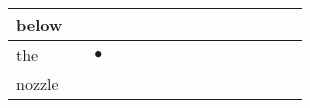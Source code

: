\documentclass[landscape]{article}
\newcommand{\ssp}{\hspace{2pt}}
\newcommand{\mex}{\cellcolor{g}$\bullet$}
\begin{document}
\begin{tabular}{|l|p{10pt}|p{10pt}|p{10pt}|p{10pt}|p{10pt}|p{10pt}|p{10pt}|p{10pt}|p{10pt}|p{10pt}|p{10pt}|p{10pt}|p{10pt}|p{10pt}|}
\ssp below \ssp&\hspace{2pt}&\hspace{2pt}&\hspace{2pt}&\hspace{2pt}&\hspace{2pt}&\hspace{2pt}&\hspace{2pt}&\hspace{2pt}&\hspace{2pt}&\hspace{2pt}&\hspace{2pt}&\hspace{2pt}&\hspace{2pt}&\hspace{2pt}\\
\hline
\ssp \cellcolor{ref1}the \ssp&\hspace{2pt}&\hspace{2pt}\mex&\hspace{2pt}&\hspace{2pt}&\hspace{2pt}&\hspace{2pt}&\hspace{2pt}&\hspace{2pt}&\hspace{2pt}&\hspace{2pt}&\hspace{2pt}&\hspace{2pt}&\hspace{2pt}&\hspace{2pt}\\
\hline
\ssp nozzle \ssp&\hspace{2pt}&\hspace{2pt}&\hspace{2pt}&\hspace{2pt}&\hspace{2pt}&\hspace{2pt}&\hspace{2pt}&\hspace{2pt}&\hspace{2pt}&\hspace{2pt}&\hspace{2pt}&\hspace{2pt}&\hspace{2pt}&\hspace{2pt}\\
\hline

\end{tabular}
\end{document}
